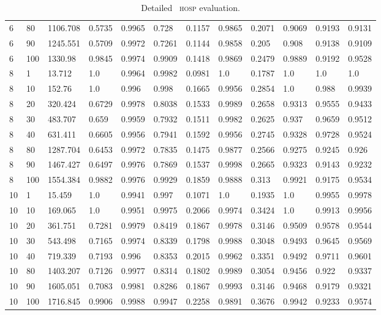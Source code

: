 \begin{table*}[!htbp]
\begin{tabular}{@{}llllllllllll@{}}
6&80&1106.708&0.5735&0.9965&0.728&0.1157&0.9865&0.2071&0.9069&0.9193&0.9131 \\
6&90&1245.551&0.5709&0.9972&0.7261&0.1144&0.9858&0.205&0.908&0.9138&0.9109 \\
6&100&1330.98&0.9845&0.9974&0.9909&0.1418&0.9869&0.2479&0.9889&0.9192&0.9528 \\
8&1&13.712&1.0&0.9964&0.9982&0.0981&1.0&0.1787&1.0&1.0&1.0 \\
8&10&152.76&1.0&0.996&0.998&0.1665&0.9956&0.2854&1.0&0.988&0.9939 \\
8&20&320.424&0.6729&0.9978&0.8038&0.1533&0.9989&0.2658&0.9313&0.9555&0.9433 \\
8&30&483.707&0.659&0.9959&0.7932&0.1511&0.9982&0.2625&0.937&0.9659&0.9512 \\
8&40&631.411&0.6605&0.9956&0.7941&0.1592&0.9956&0.2745&0.9328&0.9728&0.9524 \\
8&80&1287.704&0.6453&0.9972&0.7835&0.1475&0.9877&0.2566&0.9275&0.9245&0.926 \\
8&90&1467.427&0.6497&0.9976&0.7869&0.1537&0.9998&0.2665&0.9323&0.9143&0.9232 \\
8&100&1554.384&0.9882&0.9976&0.9929&0.1859&0.9888&0.313&0.9921&0.9175&0.9534 \\
10&1&15.459&1.0&0.9941&0.997&0.1071&1.0&0.1935&1.0&0.9955&0.9978 \\
10&10&169.065&1.0&0.9951&0.9975&0.2066&0.9974&0.3424&1.0&0.9913&0.9956 \\
10&20&361.751&0.7281&0.9979&0.8419&0.1867&0.9978&0.3146&0.9509&0.9578&0.9544 \\
10&30&543.498&0.7165&0.9974&0.8339&0.1798&0.9988&0.3048&0.9493&0.9645&0.9569 \\
10&40&719.339&0.7193&0.996&0.8353&0.2015&0.9962&0.3351&0.9492&0.9711&0.9601 \\
10&80&1403.207&0.7126&0.9977&0.8314&0.1802&0.9989&0.3054&0.9456&0.922&0.9337 \\
10&90&1605.051&0.7083&0.9981&0.8286&0.1867&0.9993&0.3146&0.9468&0.9179&0.9321 \\
10&100&1716.845&0.9906&0.9988&0.9947&0.2258&0.9891&0.3676&0.9942&0.9233&0.9574 \\ \bottomrule
\end{tabular}
\caption{\label{tab:hospeval} Detailed ~\textsc{hosp} evaluation.}
\end{table*}


